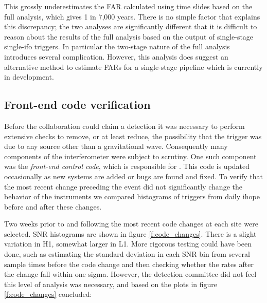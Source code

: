 This grossly underestimates the FAR calculated using time slides based
on the full analysis, which gives 1 in 7,000 years.  There is no
simple factor that explains this discrepancy; the two analyses are
significantly different that it is difficult to reason about the
results of the full analysis based on the output of single-stage
single-ifo triggers.  In particular the two-stage nature of the full
analysis introduces several complication.  However, this analysis does
suggest an alternative method to estimate FARs for a single-stage
pipeline which is currently in development.
\fi


\subsection{Front-end code verification}


Before the collaboration could claim a detection it was necessary to
perform extensive checks to remove, or at least reduce, the
possibility that the trigger was due to any source other than a
gravitational wave.  Consequently many components of the
interferometer were subject to scrutiny.  One such component was the
\emph{front-end control code}, which is responsible for .  This code is updated occasionally as new systems are
added or bugs are found and fixed.   To verify that the most recent
change preceding the event did not significantly change the behavior
of the instruments we compared histograms of triggers from daily ihope
before and after these changes.

Two weeks prior to and following the most recent code changes at each
site were selected.  SNR histograms are shown in figure
\ref{f:code_changes}.  There is a slight variation in H1, somewhat
larger in L1.  More rigorous testing could have been done, such as
estimating the standard deviation in each SNR bin from several sample
times before the code change and then checking whether the rates after
the change fall within one sigma.  However, the detection committee
did not feel this level of analysis was necessary, and based on the
plots in figure \ref{f:code_changes} concluded:

